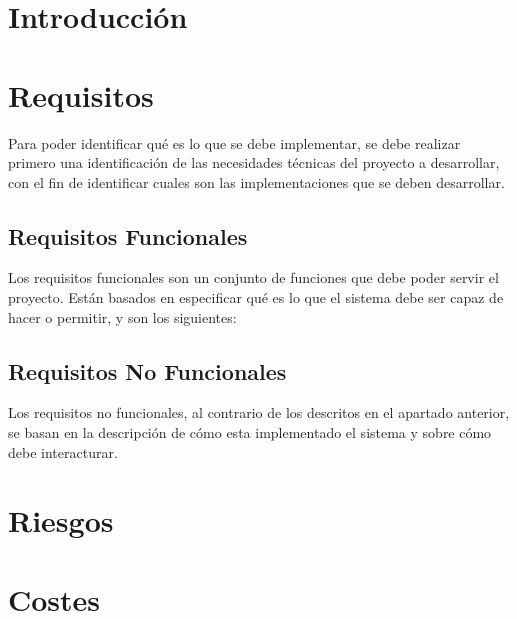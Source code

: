 \section{Introducción}


\section{Requisitos}

Para poder identificar qué es lo que se debe implementar, se debe realizar primero una identificación de las necesidades técnicas del proyecto a desarrollar, con el fin de identificar cuales son las implementaciones que se deben desarrollar.

\subsection{Requisitos Funcionales}

Los requisitos funcionales son un conjunto de funciones que debe poder servir el proyecto. Están basados en especificar qué es lo que el sistema debe ser capaz de hacer o permitir, y son los siguientes:

    


\subsection{Requisitos No Funcionales}

Los requisitos no funcionales, al contrario de los descritos en el apartado anterior, se basan en la descripción de cómo esta implementado el sistema y sobre cómo debe interacturar.

    

\newpage
\section{Riesgos}

    

\newpage
\section{Costes}

    

